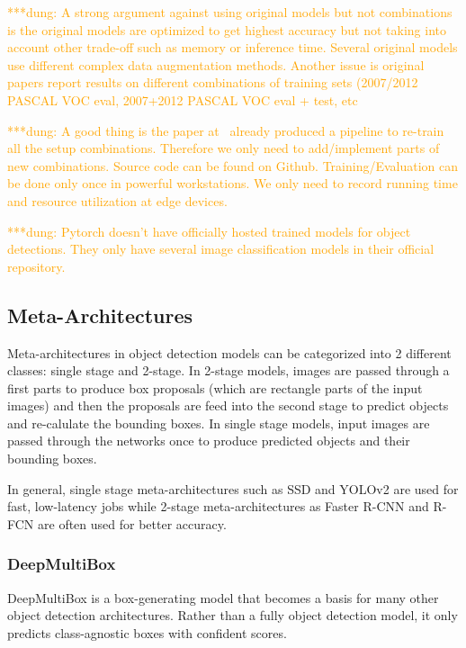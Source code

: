 \documentclass[conference]{IEEEtran}
\newcommand{\alnote}[1]{ {\textcolor{blue} { ***andre: #1 }}}
\newcommand{\dungnote}[1]{ {\textcolor{orange} { ***dung: #1 }}}
\newcommand{\alnote}[1]{}
\newcommand{\dungnote}[1]{}
\begin{document}
\dungnote{A strong argument against using original models but not combinations is the original models are optimized to get highest accuracy but not taking into account other trade-off such as memory or inference time. Several original models use different complex data augmentation methods. Another issue is original papers report results on different combinations of training sets (2007/2012 PASCAL VOC eval, 2007+2012 PASCAL VOC eval + test, etc}

\dungnote{A good thing is the paper at~\cite{huang2017speed} already produced a pipeline to re-train all the setup combinations. Therefore we only need to add/implement parts of new combinations. Source code can be found on Github. Training/Evaluation can be done only once in powerful workstations. We only need to record running time and resource utilization at edge devices.}

\dungnote{Pytorch doesn't have officially hosted trained models for object detections. They only have several image classification models in their official repository.}

\subsection{Meta-Architectures}


Meta-architectures in object detection models can be categorized into 2 different classes: single stage and 2-stage. In 2-stage models, images are passed through a first parts to produce box proposals (which are rectangle parts of the input images) and then the proposals are feed into the second stage to predict objects and re-calulate the bounding boxes. In single stage models, input images are passed through the networks once to produce predicted objects and their bounding boxes.

In general, single stage meta-architectures such as SSD and YOLOv2 are used for fast, low-latency jobs while 2-stage meta-architectures as Faster R-CNN and R-FCN are often used for better accuracy.

\subsubsection{DeepMultiBox}
DeepMultiBox is a box-generating model that becomes a basis for many other object detection architectures. Rather than a fully object detection model, it only predicts class-agnostic boxes with confident scores.
\end{document}

